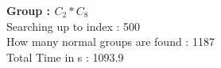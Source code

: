 \textbf{Group : $C_2*C_8$}\\
Searching up to index : 500\\
How many normal groups are found : 1187\\
Total Time in s : 1093.9\\

